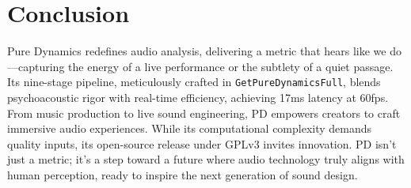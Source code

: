 \documentclass[11pt]{article}
\begin{document}
\section{Conclusion}
Pure Dynamics redefines audio analysis, delivering a metric that hears like we do—capturing the energy of a live performance or the subtlety of a quiet passage. Its nine-stage pipeline, meticulously crafted in \texttt{GetPureDynamicsFull}, blends psychoacoustic rigor with real-time efficiency, achieving 17ms latency at 60fps. From music production to live sound engineering, PD empowers creators to craft immersive audio experiences. While its computational complexity demands quality inputs, its open-source release under GPLv3 invites innovation. PD isn’t just a metric; it’s a step toward a future where audio technology truly aligns with human perception, ready to inspire the next generation of sound design.



\end{document}
